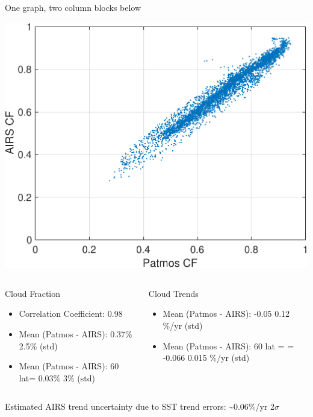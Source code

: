 \documentclass[10pt,t]{beamer}
\begin{document}
\begin{frame}[label={sec:orgffcde70}]{One graph, two column blocks below}
\vspace{-0.15in}

\begin{center}
\includegraphics[width=0.55\linewidth]{./Figs/scatter_cloud_airs_patmos_pm60lat_threshold5p5.pdf}
\end{center}

\vspace{-0.3in}

\begin{columns}
\begin{column}{0.6\columnwidth}
\begin{block}{Cloud Fraction}
\begin{footnotesize}
\begin{itemize}
\item Correlation Coefficient:  0.98
\item Mean (Patmos - AIRS):  0.37\% \textpm{} 2.5\% (std)
\item Mean (Patmos - AIRS): \textpm{}60\textdegree{} lat= 0.03\% \textpm{} 3\% (std)
\end{itemize}
\end{footnotesize}
\end{block}
\end{column}
\begin{column}{0.6\columnwidth}
\begin{block}{Cloud Trends}
\begin{footnotesize}
\begin{itemize}
\item Mean (Patmos - AIRS): -0.05 \textpm{}0.12 \%/yr (std)
\item Mean (Patmos - AIRS): \textpm{}60\textdegree{} lat = = -0.066 \textpm{}0.015 \%/yr (std)
\end{itemize}
\end{footnotesize}
\end{block}
\end{column}
\end{columns}

\vspace{-0.05in}
\footnotesize Estimated AIRS trend uncertainty due to SST trend errors:  \textasciitilde{}0.06\%/yr 2\(\sigma\)
\end{frame}
\end{document}
